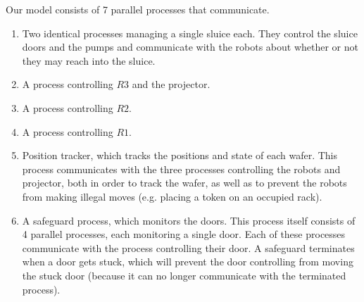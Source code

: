 
Our model consists of 7 parallel processes that communicate.
\begin{enumerate}
 \item Two identical processes managing a single sluice each. They control the sluice doors and the pumps and communicate with the robots about whether or not they may reach into the sluice.
 \item A process controlling $R3$ and the projector.
 \item A process controlling $R2$.
 \item A process controlling $R1$.
 \item Position tracker, which tracks the positions and state of each wafer. This process communicates with the three processes controlling the robots and projector, both in order to track the wafer, as well as to prevent the robots from making illegal moves (e.g. placing a token on an occupied rack).
 \item A safeguard process, which monitors the doors. This process itself consists of 4 parallel processes, each monitoring a single door. Each of these processes communicate with the process controlling their door. A safeguard terminates when a door gets stuck, which will prevent the door controlling from moving the stuck door (because it can no longer communicate with the terminated process).
\end{enumerate}
